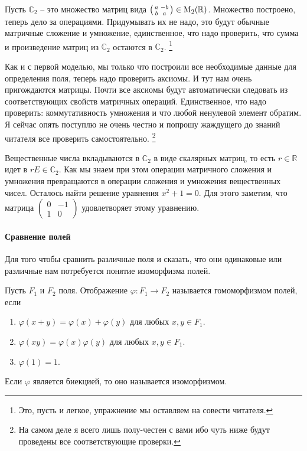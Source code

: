 Пусть $\mathbb C_2$ -- это множество матриц вида $\left(\begin{smallmatrix}{a}&{-b}\\{b}&{a}\end{smallmatrix}\right)\in\operatorname{M}_{2}(\mathbb R)$.
Множество построено, теперь дело за операциями.
Придумывать их не надо, это будут обычные матричные сложение и умножение, единственное, что надо проверить, что сумма и произведение матриц из $\mathbb C_2$ остаются в $\mathbb C_2$.%
\footnote{Это, пусть и легкое, упражнение мы оставляем на совести читателя.} 

Как и с первой моделью, мы только что построили все необходимые данные для определения поля, теперь надо проверить аксиомы.
И тут нам очень пригождаются матрицы.
Почти все аксиомы будут автоматически следовать из соответствующих свойств матричных операций.
Единственное, что надо проверить: коммутативность умножения и что любой ненулевой элемент обратим.
Я сейчас опять поступлю не очень честно и попрошу жаждущего до знаний читателя все проверить самостоятельно.%
\footnote{На самом деле я всего лишь полу-честен с вами ибо чуть ниже будут проведены все соответствующие проверки.}

Вещественные числа вкладываются в $\mathbb C_2$ в виде скалярных матриц, то есть $r\in\mathbb R$ идет в $rE\in\mathbb C_2$.
Как мы знаем при этом операции матричного сложения и умножения превращаются в операции сложения и умножения вещественных чисел.
Осталось найти решение уравнения $x^2+1 = 0$.
Для этого заметим, что матрица $\left(\begin{smallmatrix}{0}&{-1}\\{1}&{0}\end{smallmatrix}\right)$ удовлетворяет этому уравнению.

\paragraph{Сравнение полей}

Для того чтобы сравнить различные поля и сказать, что они одинаковые или различные нам потребуется понятие изоморфизма полей.

\begin{definition}
Пусть $F_1$ и $F_2$ поля.
Отображение $\varphi\colon F_1\to F_2$ называется гомоморфизмом полей, если 
\begin{enumerate}
\item $\varphi(x+y) = \varphi(x) + \varphi(y)$ для любых $x,y\in F_1$.

\item $\varphi(xy) = \varphi(x)\varphi(y)$ для любых $x,y\in F_1$.

\item $\varphi(1) = 1$.
\end{enumerate}
Если $\varphi$ является биекцией, то оно называется изоморфизмом.
\end{definition}

